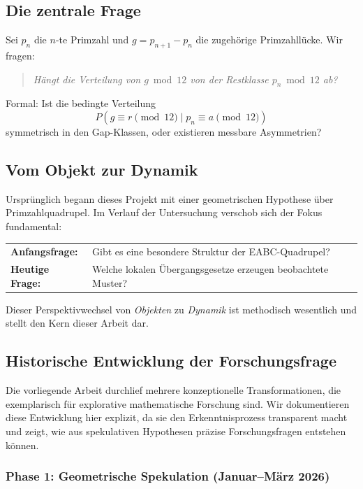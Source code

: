 \documentclass[11pt,a4paper]{article}
\begin{document}
\subsection{Die zentrale Frage}

Sei $p_n$ die $n$-te Primzahl und $g = p_{n+1} - p_n$ die zugehörige Primzahllücke. Wir fragen:

\begin{quote}
\textit{Hängt die Verteilung von $g \bmod 12$ von der Restklasse $p_n \bmod 12$ ab?}
\end{quote}

Formal: Ist die bedingte Verteilung
\[
P(g \equiv r \pmod{12} \mid p_n \equiv a \pmod{12})
\]
symmetrisch in den Gap-Klassen, oder existieren messbare Asymmetrien?

\subsection{Vom Objekt zur Dynamik}

Ursprünglich begann dieses Projekt mit einer geometrischen Hypothese über Primzahlquadrupel. Im Verlauf der Untersuchung verschob sich der Fokus fundamental:

\begin{center}
\begin{tabular}{ll}
\textbf{Anfangsfrage:} & Gibt es eine besondere Struktur der EABC-Quadrupel? \\
\textbf{Heutige Frage:} & Welche lokalen Übergangsgesetze erzeugen beobachtete Muster?
\end{tabular}
\end{center}

Dieser Perspektivwechsel von \textit{Objekten} zu \textit{Dynamik} ist methodisch wesentlich und stellt den Kern dieser Arbeit dar.

\subsection{Historische Entwicklung der Forschungsfrage}

Die vorliegende Arbeit durchlief mehrere konzeptionelle Transformationen, die exemplarisch für explorative mathematische Forschung sind. Wir dokumentieren diese Entwicklung hier explizit, da sie den Erkenntnisprozess transparent macht und zeigt, wie aus spekulativen Hypothesen präzise Forschungsfragen entstehen können.

\subsubsection{Phase 1: Geometrische Spekulation (Januar--März 2026)}
\end{document}
